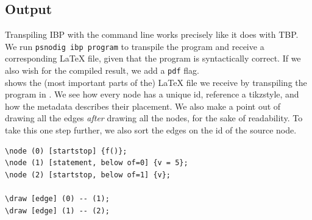 \subsection{Output}

Transpiling IBP with the command line works precisely like it does with TBP. We run \texttt{psnodig ibp program} to transpile the program and receive a corresponding LaTeX file, given that the program is syntactically correct. If we also wish for the compiled result, we add a \texttt{pdf} flag. \\

 shows the (most important parts of the) LaTeX file we receive by transpiling the program in . We see how every node has a unique id, reference a tikzstyle, and how the metadata describes their placement. We also make a point out of drawing all the edges \textit{after} drawing all the nodes, for the sake of readability. To take this one step further, we also sort the edges on the id of the source node. \\

\begin{lstlisting}[caption={Excerpt of the LaTeX from transpiling \Cref{Gourmet f} to IBP.}, captionpos=b, label={Example output from compiling Flowchart}]
\node (0) [startstop] {f()};
\node (1) [statement, below of=0] {v = 5};
\node (2) [startstop, below of=1] {v};

\draw [edge] (0) -- (1);
\draw [edge] (1) -- (2);
\end{lstlisting}
